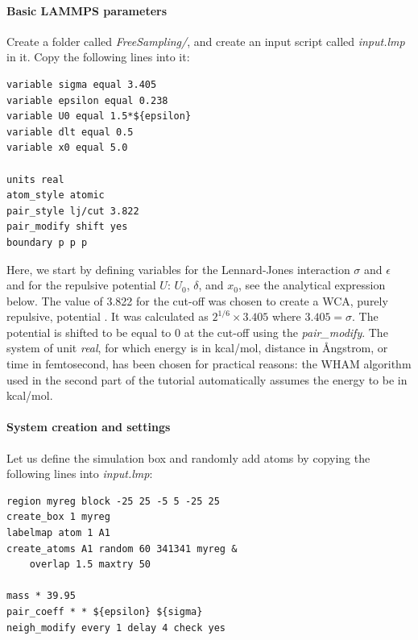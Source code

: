 \documentclass[9pt,tutorial]{livecoms}
\begin{document}
\paragraph{Basic LAMMPS parameters}
\noindent Create a folder called \textit{FreeSampling/}, and create an input
script called \textit{input.lmp} in it. Copy the following lines into it:
{\normalsize \begin{verbatim}
variable sigma equal 3.405
variable epsilon equal 0.238
variable U0 equal 1.5*${epsilon}
variable dlt equal 0.5
variable x0 equal 5.0

units real
atom_style atomic
pair_style lj/cut 3.822
pair_modify shift yes
boundary p p p
\end{verbatim}}
Here, we start by defining variables for the Lennard-Jones interaction
$\sigma$ and $\epsilon$ and for the repulsive potential $U$: $U_0$, $\delta$, and $x_0$,
see the analytical expression below. The value of 3.822 for the cut-off was chosen to
create a WCA, purely repulsive, potential \cite{weeks1971role}. It was calculated
as $2^{1/6} \times 3.405$ where $3.405 = \sigma$. The potential is shifted to be
equal to 0 at the cut-off using the \textit{pair\_modify}. The system of unit
\textit{real}, for which energy is in kcal/mol, distance in Ångstrom, or time in
femtosecond, has been chosen for practical reasons: the WHAM algorithm used in
the second part of the tutorial automatically assumes the energy to be in kcal/mol.

\paragraph{System creation and settings}
\noindent Let us define the simulation box and randomly add atoms by copying the
following lines into \textit{input.lmp}:
{\normalsize \begin{verbatim}
region myreg block -25 25 -5 5 -25 25
create_box 1 myreg
labelmap atom 1 A1
create_atoms A1 random 60 341341 myreg &
    overlap 1.5 maxtry 50

mass * 39.95
pair_coeff * * ${epsilon} ${sigma}
neigh_modify every 1 delay 4 check yes
\end{verbatim}}
\end{document}
